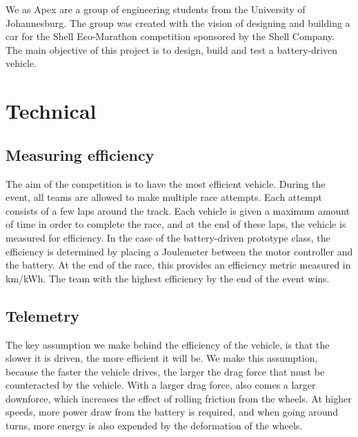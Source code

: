 \documentclass[a4paper, 12pt]{article}
\begin{document}
		We as Apex are a group of engineering students from the University of Johannesburg. The group was created with the vision of designing and building a car for the Shell Eco-Marathon competition sponsored by the Shell Company. The main objective of this project is to design, build and test a battery-driven vehicle.

	\section{Technical} %
	\label{sec:technical}
		\subsection{Measuring efficiency} %
		\label{sub:measuring_efficiency}
			The aim of the competition is to have the most efficient vehicle. During the event, all teams are allowed to make multiple race attempts. Each attempt consists of a few laps around the track. Each vehicle is given a maximum amount of time in order to complete the race, and at the end of these laps, the vehicle is measured for efficiency. In the case of the battery-driven prototype class, the efficiency is determined by placing a Joulemeter between the motor controller and the battery. At the end of the race, this provides an efficiency metric measured in km/kWh. The team with the highest efficiency by the end of the event wins.

		\subsection{Telemetry} %
		\label{sub:telemetry_solution}
			The key assumption we make behind the efficiency of the vehicle, is that the slower it is driven, the more efficient it will be. We make this assumption, because the faster the vehicle drives, the larger the drag force that must be counteracted by the vehicle. With a larger drag force, also comes a larger downforce, which increases the effect of rolling friction from the wheels. At higher speeds, more power draw from the battery is required, and when going around turns, more energy is also expended by the deformation of the wheels. 
\end{document}

